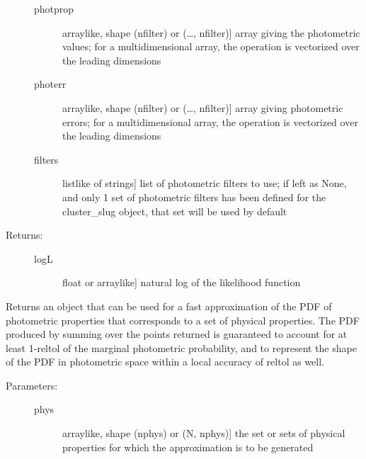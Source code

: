 \documentclass[letterpaper,10pt,english]{sphinxmanual}
\begin{document}
\begin{fulllineitems}
\begin{fulllineitems}
\begin{description}
\begin{description}
\item[{photprop}] \leavevmode{[}arraylike, shape (nfilter) or (…, nfilter){]}
array giving the photometric values; for a
multidimensional array, the operation is vectorized over
the leading dimensions

\item[{photerr}] \leavevmode{[}arraylike, shape (nfilter) or (…, nfilter){]}
array giving photometric errors; for a multidimensional
array, the operation is vectorized over the leading
dimensions

\item[{filters}] \leavevmode{[}listlike of strings{]}
list of photometric filters to use; if left as None, and
only 1 set of photometric filters has been defined for
the cluster\_slug object, that set will be used by
default

\end{description}

\item[{Returns:}] \leavevmode\begin{description}
\item[{logL}] \leavevmode{[}float or arraylike{]}
natural log of the likelihood function

\end{description}

\end{description}

\end{fulllineitems}


\begin{fulllineitems}
\label{\detokenize{cluster_slug:slugpy.cluster_slug.cluster_slug.make_approx_phot}}
Returns an object that can be used for a fast approximation of
the PDF of photometric properties that corresponds to a set of
physical properties. The PDF produced by summing over the
points returned is guaranteed to account for at least 1-reltol
of the marginal photometric probability, and to represent the
shape of the PDF in photometric space within a local accuracy
of reltol as well.
\begin{description}
\item[{Parameters:}] \leavevmode\begin{description}
\item[{phys}] \leavevmode{[}arraylike, shape (nphys) or (N, nphys){]}
the set or sets of physical properties for which the
approximation is to be generated


\end{description}
\end{description}
\end{fulllineitems}
\end{fulllineitems}
\end{document}
